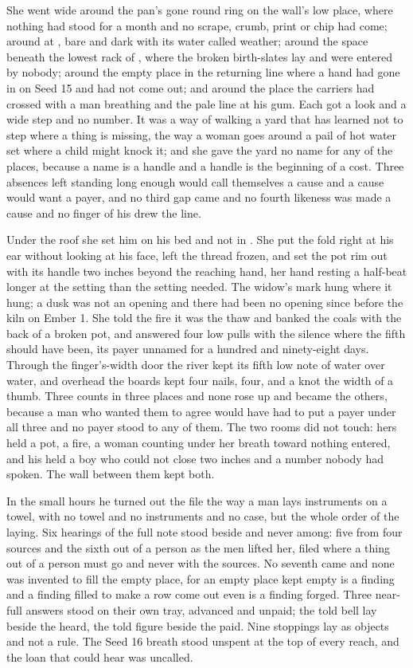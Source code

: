 She went wide around the pan's gone round ring on the wall's low place, where nothing had stood for a month and no scrape, crumb, print or chip had come; around  at , bare and dark with its water called weather; around the space beneath the lowest rack of , where the broken birth-slates lay and were entered by nobody; around the empty place in the returning line where a hand had gone in on Seed 15 and had not come out; and around the place the carriers had crossed with a man breathing and the pale line at his gum. Each got a look and a wide step and no number. It was a way of walking a yard that has learned not to step where a thing is missing, the way a woman goes around a pail of hot water set where a child might knock it; and she gave the yard no name for any of the places, because a name is a handle and a handle is the beginning of a cost. Three absences left standing long enough would call themselves a cause and a cause would want a payer, and no third gap came and no fourth likeness was made a cause and no finger of his drew the line.

Under the roof she set him on his bed and not in . She put the fold right at his ear without looking at his face, left the thread frozen, and set the pot rim out with its handle two inches beyond the reaching hand, her hand resting a half-beat longer at the setting than the setting needed. The widow's mark hung where it hung; a dusk was not an opening and there had been no opening since before the kiln on Ember 1. She told the fire it was the thaw and banked the coals with the back of a broken pot, and  answered four low pulls with the silence where the fifth should have been, its payer unnamed for a hundred and ninety-eight days. Through the finger's-width door the river kept its fifth low note of water over water, and overhead the boards kept four nails, four, and a knot the width of a thumb. Three counts in three places and none rose up and became the others, because a man who wanted them to agree would have had to put a payer under all three and no payer stood to any of them. The two rooms did not touch: hers held a pot, a fire, a woman counting under her breath toward nothing entered, and his held a boy who could not close two inches and a number nobody had spoken. The wall between them kept both.

In the small hours he turned out the file the way a man lays instruments on a towel, with no towel and no instruments and no case, but the whole order of the laying. Six hearings of the full note stood beside and never among: five from four sources and the sixth out of a person as the men lifted her, filed where a thing out of a person must go and never with the sources. No seventh came and none was invented to fill the empty place, for an empty place kept empty is a finding and a finding filled to make a row come out even is a finding forged. Three near-full answers stood on their own tray, advanced and unpaid; the told bell lay beside the heard, the told figure beside the paid. Nine stoppings lay as objects and not a rule. The Seed 16 breath stood unspent at the top of every reach, and the loan that could hear was uncalled.


